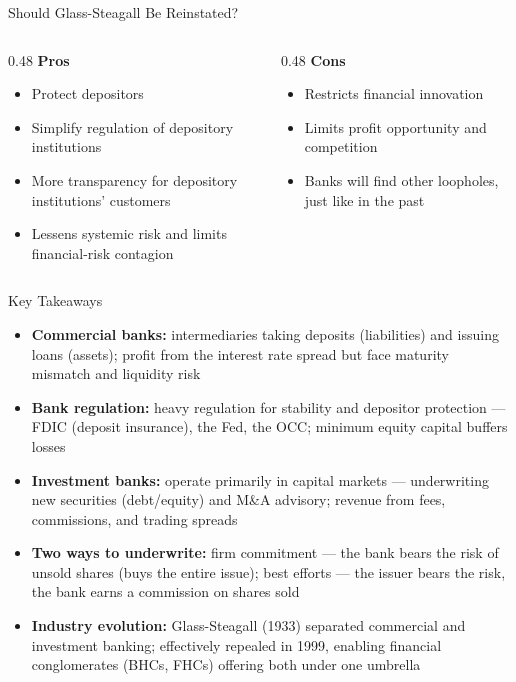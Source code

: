 \documentclass[aspectratio=169]{beamer}
\begin{document}
\begin{frame}{Should Glass-Steagall Be Reinstated?}
\begin{columns}
\begin{column}{0.48\textwidth}
\textbf{Pros}
\begin{itemize}
  \item Protect depositors
  \item Simplify regulation of depository institutions
  \item More transparency for depository institutions' customers
  \item Lessens systemic risk and limits financial-risk contagion
\end{itemize}
\end{column}
\begin{column}{0.48\textwidth}
\textbf{Cons}
\begin{itemize}
  \item Restricts financial innovation
  \item Limits profit opportunity and competition
  \item Banks will find other loopholes, just like in the past
\end{itemize}
\end{column}
\end{columns}
\end{frame}

\begin{frame}{Key Takeaways}
\begin{itemize}
  \item \textbf{Commercial banks:} intermediaries taking deposits (liabilities) and issuing loans (assets); profit from the interest rate spread but face maturity mismatch and liquidity risk
  \item \textbf{Bank regulation:} heavy regulation for stability and depositor protection --- FDIC (deposit insurance), the Fed, the OCC; minimum equity capital buffers losses
  \item \textbf{Investment banks:} operate primarily in capital markets --- underwriting new securities (debt/equity) and M\&A advisory; revenue from fees, commissions, and trading spreads
  \item \textbf{Two ways to underwrite:} firm commitment --- the bank bears the risk of unsold shares (buys the entire issue); best efforts --- the issuer bears the risk, the bank earns a commission on shares sold
  \item \textbf{Industry evolution:} Glass-Steagall (1933) separated commercial and investment banking; effectively repealed in 1999, enabling financial conglomerates (BHCs, FHCs) offering both under one umbrella
\end{itemize}
\end{frame}
\end{document}
